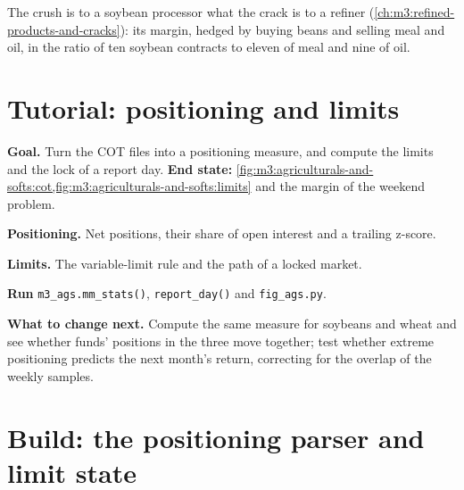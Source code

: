 The crush is to a soybean processor what the crack is to a refiner
(\cref{ch:m3:refined-products-and-cracks}): its margin, hedged by buying beans and selling meal and oil,
in the ratio of ten soybean contracts to eleven of meal and nine of oil.

\section{Tutorial: positioning and limits}\label{tut:m3:agriculturals-and-softs:cot}

\begin{tutorial}
\textbf{Goal.} Turn the COT files into a positioning measure, and compute the limits and the lock of a
report day. \textbf{End state:}
\cref{fig:m3:agriculturals-and-softs:cot,fig:m3:agriculturals-and-softs:limits} and the margin of the
weekend problem.
\begin{tutsteps}
\item \textbf{Positioning.} Net positions, their share of open interest and a trailing z-score.
\label{lst:m3:agriculturals-and-softs:cot}
\item \textbf{Limits.} The variable-limit rule and the path of a locked market.
\label{lst:m3:agriculturals-and-softs:limits}
\item \textbf{Run} \texttt{m3\_ags.mm\_stats()}, \texttt{report\_day()} and \texttt{fig\_ags.py}.
\end{tutsteps}
\textbf{What to change next.} Compute the same measure for soybeans and wheat and see whether funds'
positions in the three move together; test whether extreme positioning predicts the next month's return,
correcting for the overlap of the weekly samples.
\end{tutorial}

\section{Build: the positioning parser and limit state}\label{bld:m3:agriculturals-and-softs:cot}

